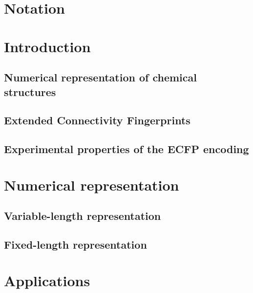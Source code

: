 \documentclass{report}
\title{}
\author{}
\date{}
\begin{document}




\tableofcontents

\chapter*{Notation} \label{ch:notation}


\chapter{Introduction}
\section{Numerical representation of chemical structures}


\section{Extended Connectivity Fingerprints}


\section{Experimental properties of the ECFP encoding}



\chapter{Numerical representation}
\section{Variable-length representation}


\section{Fixed-length representation}



\chapter{Applications}
\end{document}
